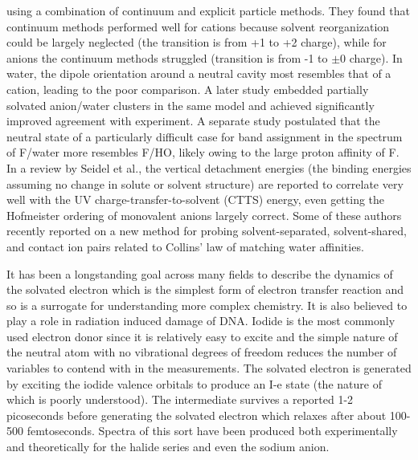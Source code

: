 \begin{intro}
   using a combination of continuum and explicit particle methods. They found that continuum methods performed well for cations because solvent reorganization could be largely 
   neglected (the transition is from +1 to +2 charge), while for anions the continuum methods struggled (transition is from -1 to $\pm$0 charge). In water, the dipole orientation
   around a neutral cavity most resembles that of a cation\cite{wipff1999tatb,wipff2000tatb,wipff2001tatb,hummer1996}, leading to the poor comparison. A later study embedded partially
   solvated anion/water clusters in the same model and achieved significantly improved agreement with experiment\cite{dolgounitcheva2014microsolvation}. A separate study postulated
   that the neutral state of a particularly difficult case for band assignment in the spectrum of F\sur{-}/water more resembles F\sur{-}/HO\sur{+}\cite{canuto2010delocalized}, 
   likely owing to the large proton affinity of F\sur{-}\cite{kim2002bigall}. In a review by Seidel et al.\cite{seidel2016valence}, the vertical detachment energies (the binding 
   energies assuming no change in solute or solvent structure) are reported to correlate very well with the UV charge-transfer-to-solvent (CTTS) energy, even getting the Hofmeister 
   ordering of monovalent anions largely correct. Some of these authors recently reported on a new method for probing solvent-separated, solvent-shared, and contact ion pairs
   related to Collins' law of matching water affinities\cite{unger2016first}.
   
   It has been a longstanding goal across many fields to describe the dynamics of the solvated electron which is the simplest form of electron transfer reaction and so is a surrogate
   for understanding more complex chemistry. It is also believed to play a role in radiation induced damage of DNA\cite{coons2016hydrated}. Iodide is the most commonly used electron
   donor since it is relatively easy to excite and the simple nature of the neutral atom with no vibrational degrees of freedom reduces the number of variables to contend with in the 
   measurements\cite{kothe2015charge}. The solvated electron is generated by exciting the iodide valence orbitals to produce an I-e\sur{-} state (the nature of which is poorly
   understood)\cite{kothe2015charge}. The intermediate survives a reported 1-2 picoseconds before generating the solvated electron which relaxes after about 100-500 
   femtoseconds\cite{kothe2015charge}. Spectra of this sort have been produced both experimentally and theoretically for the halide series and even the sodium
   anion\cite{barthel2000direct,bradforth2002excited,galamba2009electronic,kim2000smallall,kim2002bigall,kloepfer1998femtosecond,lehr1999electron}. 
   

\end{intro}

